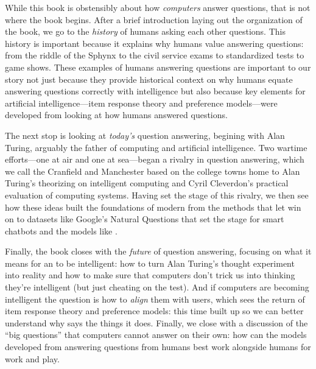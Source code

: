 
While this book is obstensibly about how \emph{computers} answer questions,
that is not where the book begins.  After a brief introduction laying out the
organization of the book, we go to the \emph{history} of humans asking each other
questions.
%
This history is important because it explains why humans value answering
questions: from the riddle of the Sphynx to the civil service exams to
standardized tests to game shows.
%
These examples of humans answering questions are important to our story not
just because they provide historical context on why humans equate answering
questions correctly with intelligence but also because key elements for
artificial intelligence---item response theory and preference models---were
developed from looking at how humans answered questions.

The next stop is looking at \emph{today's} question answering, begining with
Alan Turing, arguably the father of computing and artificial intelligence.
%
Two wartime efforts---one at air and one at sea---began a rivalry in question
answering, which we call the Cranfield and Manchester based on the college
towns home to Alan Turing's theorizing on intelligent computing and Cyril
Cleverdon's practical evaluation of computing systems.
%
Having set the stage of this rivalry, we then see how these ideas built the
foundations of modern  from the methods that let \watson{} win on
\jeopardy{} to datasets like Google's Natural Questions that set the stage for
smart chatbots and the models like .

Finally, the book closes with the \emph{future} of question answering,
focusing on what it means for an  to be intelligent: how to turn Alan
Turing's thought experiment into reality and how to make sure that computers
don't trick us into thinking they're intelligent (but just cheating on the
test).
%
And if computers are becoming intelligent the question is how to \emph{align}
them with users, which sees the return of item response theory and preference
models: this time built up so we can better understand why  says the
things it does.
%
Finally, we close with a discussion of the ``big questions'' that computers
cannot answer on their own: how can the models developed from answering
questions from humans best work alongside humans for work and play.

